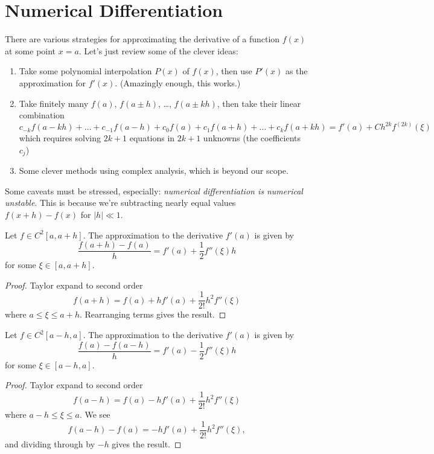 \section{Numerical Differentiation}

There are various strategies for approximating the derivative of a
function $f(x)$ at some point $x=a$. Let's just review some of the
clever ideas:
\begin{enumerate}
\item Take some polynomial interpolation $P(x)$ of $f(x)$, then use
  $P'(x)$ as the approximation for $f'(x)$. (Amazingly enough, this works.)
\item Take finitely many $f(a)$, $f(a\pm h)$, \dots, $f(a\pm kh)$, then
  take their linear combination
  $c_{-k}f(a-kh)+\dots+c_{-1}f(a-h)+c_{0}f(a)+c_{1}f(a+h)+\dots+c_{k}f(a+kh)=f'(a)+Ch^{2k}f^{(2k)}(\xi)$
  which requires solving $2k+1$ equations in $2k+1$ unknowns (the
  coefficients $c_{j}$)
\item Some clever methods using complex analysis, which is beyond our scope.
\end{enumerate}
Some caveats must be stressed, especially:
\emph{numerical differentiation is numerical unstable}. This is because
we're subtracting nearly equal values $f(x+h)-f(x)$ for $|h|\ll 1$.

\begin{defn}
  Let $f\in C^{2}[a,a+h]$.
  The  approximation to the derivative $f'(a)$
  is given by
  \begin{equation}
    \frac{f(a+h)-f(a)}{h} = f'(a) + \frac{1}{2}f''(\xi)h
  \end{equation}
  for some $\xi\in[a,a+h]$.
\end{defn}
\begin{proof}
  Taylor expand to second order
  \begin{equation}
    f(a+h) = f(a) + hf'(a) + \frac{1}{2!}h^{2}f''(\xi)
  \end{equation}
  where $a\leq\xi\leq a+h$. Rearranging terms gives the result.
\end{proof}

\begin{defn}
  Let $f\in C^{2}[a-h,a]$.
  The  approximation to the derivative $f'(a)$
  is given by
  \begin{equation}
    \frac{f(a)-f(a-h)}{h} = f'(a) - \frac{1}{2}f''(\xi)h
  \end{equation}
  for some $\xi\in[a-h,a]$.
\end{defn}
\begin{proof}
  Taylor expand to second order
  \begin{equation}
    f(a-h) = f(a) - hf'(a) + \frac{1}{2!}h^{2}f''(\xi)
  \end{equation}
  where $a-h\leq\xi\leq a$. We see
  \begin{equation}
    f(a-h)-f(a) = -hf'(a) + \frac{1}{2!}h^{2}f''(\xi),
  \end{equation}
  and dividing through by $-h$ gives the result.
\end{proof}

